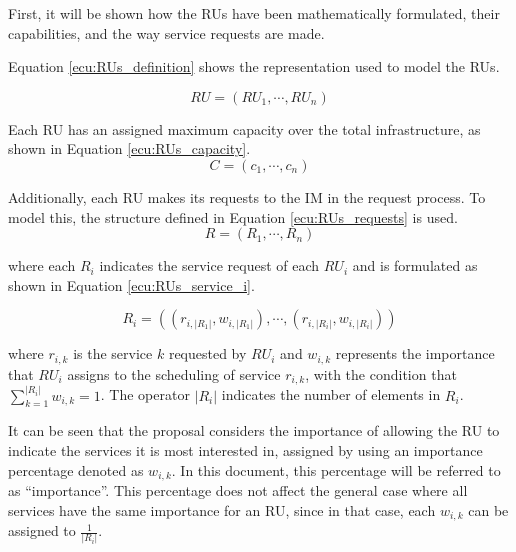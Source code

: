 \documentclass[preprint,12pt]{elsarticle}
\begin{document}
First, it will be shown how the \glspl{RU} have been mathematically formulated, their capabilities, and the way service requests are made. 

Equation \ref{ecu:RUs_definition} shows the representation used to model the \glspl{RU}.

\begin{equation}\label{ecu:RUs_definition}
    RU = (RU_1, \cdots, RU_n)
\end{equation}

Each RU has an assigned maximum capacity over the total infrastructure, as shown in Equation \ref{ecu:RUs_capacity}. 
    \begin{equation}\label{ecu:RUs_capacity}
        C = (c_1, \cdots, c_n )
    \end{equation}

Additionally, each \gls{RU} makes its requests to the \gls{IM} in the request process. To model this, the structure defined in Equation \ref{ecu:RUs_requests} is used.
\begin{equation}\label{ecu:RUs_requests}
    R = (R_1, \cdots, R_n)
\end{equation}

where each $R_i$ indicates the service request of each $RU_i$ and is formulated as shown in Equation \ref{ecu:RUs_service_i}.


\begin{equation}\label{ecu:RUs_service_i}
    R_i = ( (r_{i,|R_1|},w_{i,|R_1|}), \cdots, (r_{i,|R_i|},w_{i,|R_i|}) )
\end{equation}

where $r_{i,k}$ is the service $k$ requested by $RU_i$ and $w_{i,k}$ represents the importance that $RU_i$ assigns to the scheduling of service $r_{i,k}$, with the condition that $\sum^{|R_i|}_{k=1} w_{i,k} = 1$. The operator $|R_i|$ indicates the number of elements in $R_i$.

It can be seen that the proposal considers the importance of allowing the RU to indicate the services it is most interested in, assigned by using an importance percentage denoted as $w_{i,k}$. In this document, this percentage will be referred to as ``importance''. This percentage does not affect the general case where all services have the same importance for an RU, since in that case, each $w_{i,k}$ can be assigned to $\frac{1}{|R_i|}$.
\end{document}

